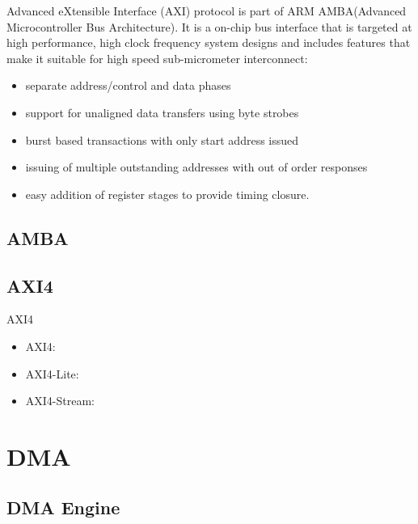 Advanced eXtensible Interface (AXI) protocol is part of ARM AMBA(Advanced Microcontroller Bus Architecture).
It is a on-chip bus interface that is targeted at high performance, high clock frequency system designs and includes features that make it suitable for high speed sub-micrometer interconnect:
\begin{itemize}
\item separate address/control and data phases
\item support for unaligned data transfers using byte strobes
\item burst based transactions with only start address issued
\item issuing of multiple outstanding addresses with out of order responses
\item easy addition of register stages to provide timing closure.
\end{itemize}

\subsection{AMBA}
\label{subsec:AMBA}


\subsection{AXI4}
\label{subsec:AXI4}
AXI4
\begin{itemize}
\item AXI4:
\item AXI4-Lite:
\item AXI4-Stream:
\end{itemize}





\section{DMA}
\label{sec:DMA}

\subsection{DMA Engine }
\label{subsec:DMA Engine}